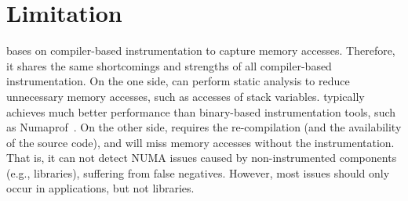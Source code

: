 \section{Limitation}
\label{sec:discussion}
\NP{} bases on compiler-based instrumentation to capture memory accesses. Therefore, it shares the same shortcomings and strengths of all compiler-based instrumentation. On the one side, \NP{} can perform static analysis to reduce unnecessary memory accesses, such as accesses of stack variables. \NP{} typically achieves much better performance than binary-based instrumentation tools, such as Numaprof~\cite{valat:2018:numaprof}. On the other side, \NP{} requires the re-compilation (and the availability of the source code), and will miss memory accesses without the instrumentation. That is, it can not detect NUMA issues caused by non-instrumented components (e.g., libraries), suffering from false negatives. However, most issues should only occur in applications, but not libraries. 
